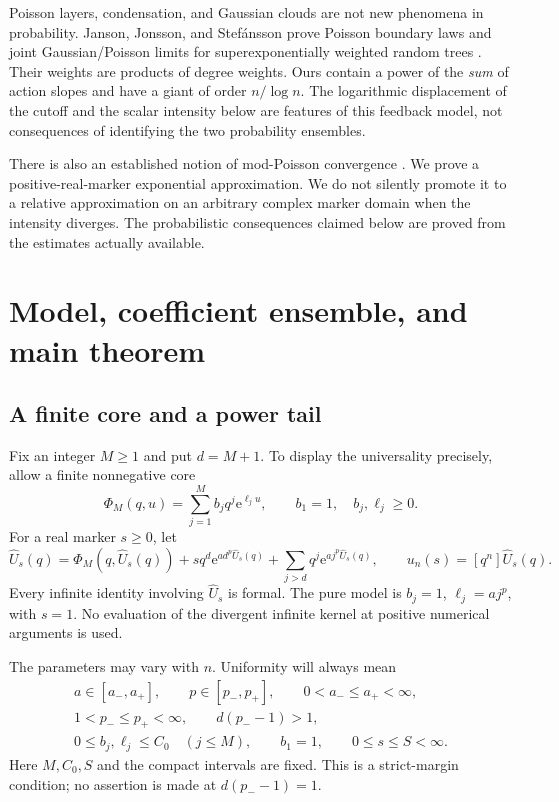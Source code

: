 \documentclass[11pt,a4paper]{article}
\numberwithin{equation}{section}
\theoremstyle{definition}
\theoremstyle{remark}
\newcommand{\ee}{\mathrm e}\newcommand{\dd}{\mathrm d}
\newcommand{\U}{\widehat U}\newcommand{\Acal}{\mathcal A}
\begin{document}
Poisson layers, condensation, and Gaussian clouds are not new phenomena in
probability. Janson, Jonsson, and Stef\'ansson prove Poisson boundary laws and
joint Gaussian/Poisson limits for superexponentially weighted random trees
\cite{jjs}. Their weights are products of degree weights. Ours contain a
power of the \emph{sum} of action slopes and have a giant of order
$n/\log n$. The logarithmic displacement of the cutoff and the scalar
intensity below are features of this feedback model, not consequences of
identifying the two probability ensembles.

There is also an established notion of mod-Poisson convergence
\cite{modpoisson}. We prove a positive-real-marker exponential approximation.
We do not silently promote it to a relative approximation on an arbitrary
complex marker domain when the intensity diverges. The probabilistic
consequences claimed below are proved from the estimates actually available.

\section{Model, coefficient ensemble, and main theorem}
\label{sec:main}
\subsection{A finite core and a power tail}
Fix an integer $M\ge1$ and put $d=M+1$. To display the universality precisely,
allow a finite nonnegative core
\begin{equation}
 \Phi_M(q,u)=\sum_{j=1}^{M} b_jq^j\ee^{\ell_j u},
 \qquad b_1=1,\quad b_j,\ell_j\ge0.
 \label{eq:core-kernel}
\end{equation}
For a real marker $s\ge0$, let
\begin{equation}
 \U_s(q)=\Phi_M(q,\U_s(q))
       +s q^d\ee^{a d^p\U_s(q)}
       +\sum_{j>d}q^j\ee^{a j^p\U_s(q)},
 \qquad u_n(s)=[q^n]\U_s(q).
 \label{eq:marked-model}
\end{equation}
Every infinite identity involving $\U_s$ is formal. The pure model is
$b_j=1$, $\ell_j=a j^p$, with $s=1$. No evaluation of the divergent infinite
kernel at positive numerical arguments is used.

The parameters may vary with $n$. Uniformity will always mean
\begin{equation}
\begin{gathered}
 a\in[a_-,a_+],\qquad p\in[p_-,p_+],\qquad
 0<a_-\le a_+<\infty,\\
 1<p_-\le p_+<\infty,\qquad d(p_--1)>1,\\
 0\le b_j,\ell_j\le C_0\quad(j\le M),\qquad b_1=1,
 \qquad 0\le s\le S<\infty.
\end{gathered}
\label{eq:uniform-domain}
\end{equation}
Here $M,C_0,S$ and the compact intervals are fixed. This is a strict-margin
condition; no assertion is made at $d(p_--1)=1$.
\end{document}
